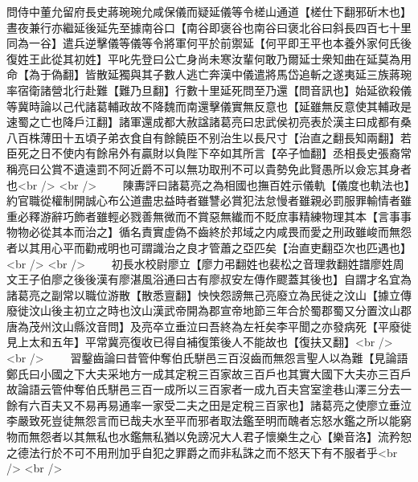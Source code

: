 問侍中董允留府長史蔣琬琬允咸保儀而疑延儀等令槎山通道【槎仕下翻邪斫木也】晝夜兼行亦繼延後延先至據南谷口【南谷即褒谷也南谷曰褒北谷曰斜長四百七十里同為一谷】遣兵逆擊儀等儀等令將軍何平於前禦延【何平即王平也本養外家何氏後復姓王此從其初姓】平叱先登曰公亡身尚未寒汝輩何敢乃爾延士衆知曲在延莫為用命【為于偽翻】皆散延獨與其子數人逃亡奔漢中儀遣將馬岱追斬之遂夷延三族蔣琬率宿衛諸營北行赴難【難乃旦翻】行數十里延死問至乃還【問音訊也】始延欲殺儀等冀時論以己代諸葛輔政故不降魏而南還擊儀實無反意也【延雖無反意使其輔政是速蜀之亡也降戶江翻】諸軍還成都大赦諡諸葛亮曰忠武侯初亮表於漢主曰成都有桑八百株薄田十五頃子弟衣食自有餘饒臣不别治生以長尺寸【治直之翻長知兩翻】若臣死之日不使内有餘帛外有贏財以負陛下卒如其所言【卒子恤翻】丞相長史張裔常稱亮曰公賞不遺遠罰不阿近爵不可以無功取刑不可以貴勢免此賢愚所以僉忘其身者也<br />
<br />
　　陳夀評曰諸葛亮之為相國也撫百姓示儀軌【儀度也軌法也】約官職從權制開誠心布公道盡忠益時者雖讐必賞犯法怠慢者雖親必罰服罪輸情者雖重必釋游辭巧飾者雖輕必戮善無微而不賞惡無纎而不貶庶事精練物理其本【言事事物物必從其本而治之】循名責實虚偽不齒終於邦域之内咸畏而愛之刑政雖峻而無怨者以其用心平而勸戒明也可謂識治之良才管蕭之亞匹矣【治直吏翻亞次也匹遇也】<br />
<br />
　　初長水校尉廖立【廖力弔翻姓也裴松之音理救翻姓譜廖姓周文王子伯廖之後後漢有廖湛風浴通曰古有廖叔安左傳作飂蓋其後也】自謂才名宜為諸葛亮之副常以職位游散【散悉亶翻】怏怏怨謗無己亮廢立為民徙之汶山【據立傳廢徙汶山後主初立之時也汶山漢武帝開為郡宣帝地節三年合於蜀郡蜀又分置汶山郡唐為茂州汶山縣汶音問】及亮卒立垂泣曰吾終為左衽矣李平聞之亦發病死【平廢徙見上太和五年】平常冀亮復收已得自補復策後人不能故也【復扶又翻】<br />
<br />
　　習鑿齒論曰昔管仲奪伯氏駢邑三百沒齒而無怨言聖人以為難【見論語鄭氏曰小國之下大夫采地方一成其定稅三百家故三百戶也其實大國下大夫亦三百戶故論語云管仲奪伯氏駢邑三百一成所以三百家者一成九百夫宫室塗巷山澤三分去一餘有六百夫又不易再易通率一家受二夫之田是定稅三百家也】諸葛亮之使廖立垂泣李嚴致死豈徒無怨言而已哉夫水至平而邪者取法鑑至明而醜者忘怒水鑑之所以能窮物而無怨者以其無私也水鑑無私猶以免謗况大人君子懷樂生之心【樂音洛】流矜恕之德法行於不可不用刑加乎自犯之罪爵之而非私誅之而不怒天下有不服者乎<br />
<br />
